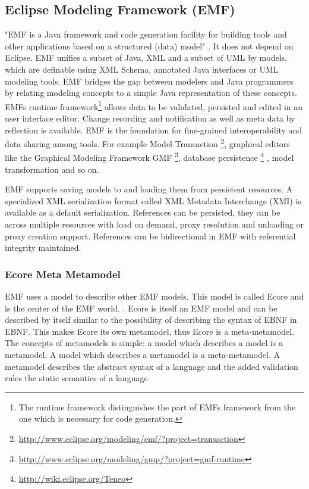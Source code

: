 \subsection{Eclipse Modeling Framework (EMF) }
"EMF is a Java framework and code generation facility for building tools and other applications based on a structured (data) model" \cite{EMFDoc}. 
It does not depend on Eclipse. EMF unifies a subset of Java, XML and a subset of UML by models, which are definable using XML Schema, annotated Java interfaces or UML modeling tools. EMF bridges the gap between modelers and Java programmers by relating modeling concepts to a simple Java representation of these concepts. \cite{EMF2nd}\\

EMFs runtime framework\footnote{\raggedright The runtime framework distinguishes the part of EMFs framework from the one which is necessary for code generation.}  allows data to be validated, persisted and edited in an user interface editor. Change recording and notification as well as meta data by reflection is available. EMF is the foundation for fine-grained interoperability and data sharing among tools. For example Model Transaction \footnote{\raggedright \url{http://www.eclipse.org/modeling/emf/?project=transaction}}, graphical editors like the Graphical Modeling Framework GMF \footnote{\raggedright \url{http://www.eclipse.org/modeling/gmp/?project=gmf-runtime}}, database persistence \footnote{\raggedright \url{http://wiki.eclipse.org/Teneo}} , model transformation and so on.

EMF supports saving models to and loading them from persistent resources. A specialized XML serialization format called XML Metadata Interchange (XMI) is available as a default serialization. References can be persisted, they can be across multiple resources with load on demand, proxy resolution and unloading or proxy creation support. References can be bidirectional in EMF with referential integrity maintained. \cite{EMF2nd}\\

\subsubsection{Ecore Meta Metamodel} \label{ecore}
EMF uses a model to describe other EMF models. This model is called Ecore and is the center of the EMF world. . Ecore is itself an EMF model and can be described by itself similar to the possibility of describing the syntax of EBNF in EBNF. This makes Ecore its own metamodel, thus Ecore is a meta-metamodel. The concepts of metamodels is simple: a model which describes a model is a metamodel. A model which describes a metamodel is a meta-metamodel. \cite{EMF2nd}  A metamodel describes the abstract syntax of a language \cite{EMP} and the added validation rules the static semantics of a language \cite{MDSD}

